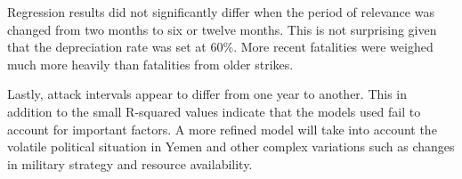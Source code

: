 \documentclass[letterpaper,12pt]{article}
\theoremstyle{definition}
\begin{document}
Regression results did not significantly differ when the period of relevance was changed from two months to six or twelve months. This is not surprising given that the depreciation rate was set at 60\%. More recent fatalities were weighed much more heavily than fatalities from older strikes. 

Lastly, attack intervals appear to differ from one year to another. This in addition to the small R-squared values indicate that the models used fail to account for important factors. A more refined model will take into account the volatile political situation in Yemen and other complex variations such as changes in military strategy and resource availability.
\end{document}
